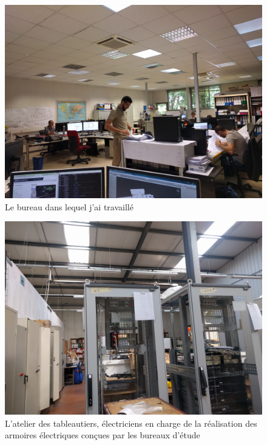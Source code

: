 \documentclass[a4paper]{article}
\begin{document}
    \begin{figure}[H]
        \centering
        \includegraphics[scale=0.05]{img/bureauEtude}
        \caption{Le bureau dans lequel j'ai travaillé}
    \end{figure}
    \vfill
    \begin{figure}[H]
        \centering
        \includegraphics[scale=0.05]{img/atelier}
        \caption{L'atelier des tableautiers, électriciens en charge de la réalisation des armoires électriques conçues par les bureaux d'étude}
    \end{figure}
    \vfill
\end{document}
